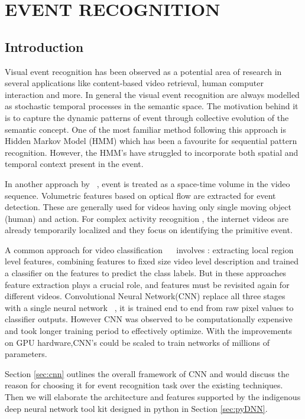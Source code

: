 \chapter{EVENT RECOGNITION}
 \label{chap:eventrec}
 \section{Introduction}
Visual event recognition has been observed as a potential area of research in several applications like  content-based video retrieval, human computer interaction and more. 
In general the visual event recognition are always modelled as stochastic temporal processes in the semantic space. The motivation behind it is to capture the dynamic patterns of event through collective evolution of the semantic concept. One of the most familiar method following this approach is Hidden Markov Model (HMM) which has been a favourite for 	sequential pattern recognition. However, the HMM's have struggled to incorporate both spatial and temporal context present in the event.  
\par In another approach by ~\cite{YanKe05}, event is treated as a space-time volume in the video sequence. Volumetric features based on optical flow are extracted for event detection. These are generally used for videos having only single moving object (human) and action. For complex activity recognition \citep{YanKe07}, the internet videos are already temporarily localized and they focus on identifying the primitive event.
\par A common approach for video classification ~\citep{Liu09}~\citep{Niebles10} involves : extracting local region level features, combining features to fixed size video level description and trained a classifier on the features to predict the class labels. But in these approaches feature extraction plays a crucial role, and features must be revisited again for different videos. Convolutional Neural Network(CNN) replace all three stages with a single neural network ~\cite{Ji13}, it is trained end to end from raw pixel values to classifier outputs. However CNN was observed to be computationally expensive and took longer training period to effectively optimize. With the improvements on GPU hardware,CNN's could be scaled to train networks of millions of parameters.

\par Section \ref{sec:cnn} outlines the overall framework of CNN and would discuss the reason for choosing it for event recognition task over the existing techniques. Then we will elaborate the architecture and features supported by the indigenous deep neural network tool kit designed in python in Section \ref{sec:pyDNN}. 

